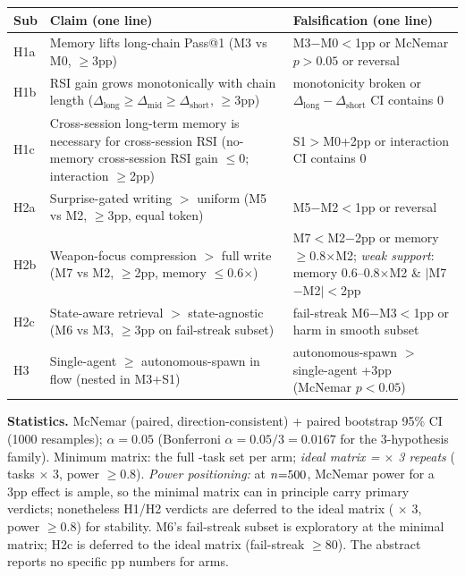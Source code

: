\begin{center}
\scriptsize
\setlength{\tabcolsep}{3pt}
\begin{tabularx}{\columnwidth}{@{}lYY@{}}
\toprule
\textbf{Sub} & \textbf{Claim (one line)} & \textbf{Falsification (one line)} \\
\midrule
H1a & Memory lifts long-chain Pass@1 (M3 vs M0, $\geq$3pp) & M3$-$M0$<$1pp or McNemar $p>0.05$ or reversal \\
H1b & RSI gain grows monotonically with chain length ($\Delta_{\text{long}}\geq\Delta_{\text{mid}}\geq\Delta_{\text{short}}$, $\geq$3pp) & monotonicity broken or $\Delta_{\text{long}}-\Delta_{\text{short}}$ CI contains 0 \\
H1c & Cross-session long-term memory is necessary for cross-session RSI (no-memory cross-session RSI gain $\leq$0; interaction $\geq$2pp) & S1$>$M0+2pp or interaction CI contains 0 \\
\midrule
H2a & Surprise-gated writing $>$ uniform (M5 vs M2, $\geq$3pp, equal token) & M5$-$M2$<$1pp or reversal \\
H2b & Weapon-focus compression $>$ full write (M7 vs M2, $\geq$2pp, memory $\leq$0.6$\times$) & M7$<$M2$-$2pp or memory $\geq$0.8$\times$M2; {\em weak support}: memory 0.6--0.8$\times$M2 \& $|$M7$-$M2$|<$2pp \\
H2c & State-aware retrieval $>$ state-agnostic (M6 vs M3, $\geq$3pp on fail-streak subset) & fail-streak M6$-$M3$<$1pp or harm in smooth subset \\
\midrule
H3 & Single-agent $\geq$ autonomous-spawn in flow (nested in M3+S1) & autonomous-spawn $>$ single-agent +3pp (McNemar $p<0.05$) \\
\bottomrule
\end{tabularx}
\end{center}

\textbf{Statistics.} McNemar (paired, direction-consistent) + paired bootstrap 95\% CI (1000 resamples); $\alpha=0.05$ (Bonferroni $\alpha=0.05/3=0.0167$ for the 3-hypothesis family). Minimum matrix: the full \Ncases{}-task set per arm; \emph{ideal matrix = \Ncases{} $\times$ 3 repeats} (\Ncases{} tasks $\times$ 3, power $\geq$0.8). \emph{Power positioning:} at $n{=}500{}$, McNemar power for a 3pp effect is ample, so the minimal matrix can in principle carry primary verdicts; nonetheless H1/H2 verdicts are deferred to the ideal matrix (\Ncases{} $\times$ 3, power $\geq$0.8) for stability. M6's fail-streak subset is exploratory at the minimal matrix; H2c is deferred to the ideal matrix (fail-streak $\geq$80). The abstract reports no specific pp numbers for arms.

